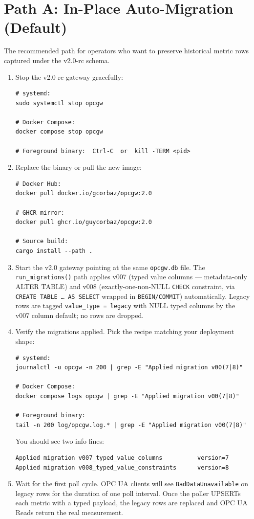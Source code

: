 \section{Path A: In-Place Auto-Migration (Default)}\label{sec-upgrade-path-a}

The recommended path for operators who want to preserve historical metric rows captured under the v2.0-rc schema.

\begin{enumerate}
\def\labelenumi{\arabic{enumi}.}
\item
  Stop the v2.0-rc gateway gracefully:

\begin{lstlisting}
# systemd:
sudo systemctl stop opcgw

# Docker Compose:
docker compose stop opcgw

# Foreground binary:  Ctrl-C  or  kill -TERM <pid>
\end{lstlisting}
\item
  Replace the binary or pull the new image:

\begin{lstlisting}
# Docker Hub:
docker pull docker.io/gcorbaz/opcgw:2.0

# GHCR mirror:
docker pull ghcr.io/guycorbaz/opcgw:2.0

# Source build:
cargo install --path .
\end{lstlisting}
\item
  Start the v2.0 gateway pointing at the same \texttt{opcgw.db} file. The \texttt{run\_migrations()} path applies v007 (typed value columns --- metadata-only ALTER TABLE) and v008 (exactly-one-non-NULL \texttt{CHECK} constraint, via \texttt{CREATE\ TABLE\ …\ AS\ SELECT} wrapped in \texttt{BEGIN/COMMIT}) automatically. Legacy rows are tagged \texttt{value\_type\ =\ \textquotesingle{}legacy\textquotesingle{}} with NULL typed columns by the v007 column default; no rows are dropped.
\item
  Verify the migrations applied. Pick the recipe matching your deployment shape:

\begin{lstlisting}
# systemd:
journalctl -u opcgw -n 200 | grep -E "Applied migration v00(7|8)"

# Docker Compose:
docker compose logs opcgw | grep -E "Applied migration v00(7|8)"

# Foreground binary:
tail -n 200 log/opcgw.log.* | grep -E "Applied migration v00(7|8)"
\end{lstlisting}

  You should see two info lines:

\begin{lstlisting}
Applied migration v007_typed_value_columns          version=7
Applied migration v008_typed_value_constraints      version=8
\end{lstlisting}
\item
  Wait for the first poll cycle. OPC UA clients will see \texttt{BadDataUnavailable} on legacy rows for the duration of one poll interval. Once the poller UPSERTs each metric with a typed payload, the legacy rows are replaced and OPC UA Reads return the real measurement.
\end{enumerate}

